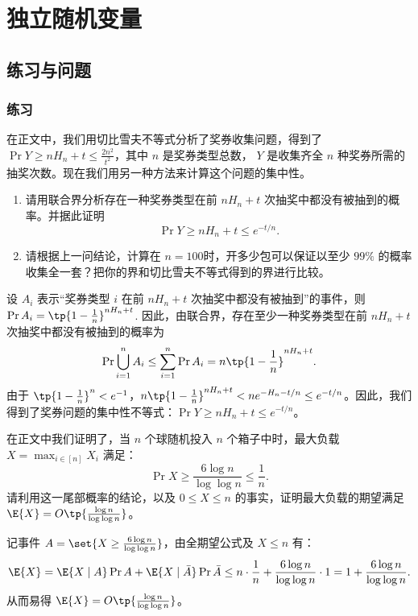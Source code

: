 \chapter{独立随机变量}
\section*{练习与问题}

\subsection*{练习}

\begin{exercise}
    在正文中，我们用切比雪夫不等式分析了奖券收集问题，得到了 $\Pr{Y\ge n H_n+t}\le \frac{2n^2}{t^2}$，其中 $n$ 是奖券类型总数， $Y$ 是收集齐全 $n$ 种奖券所需的抽奖次数。现在我们用另一种方法来计算这个问题的集中性。
    \begin{enumerate}
        \item 请用联合界分析存在一种奖券类型在前 $n H_n + t$ 次抽奖中都没有被抽到的概率。并据此证明
        \[
            \Pr{Y\ge n H_n+t}\le e^{-t/n}.
        \]
        \item 请根据上一问结论，计算在 $n=100$时，开多少包可以保证以至少 $99\%$ 的概率收集全一套？把你的界和切比雪夫不等式得到的界进行比较。
    \end{enumerate}
\end{exercise}
\begin{solution}
    设 $A_i$ 表示“奖券类型 $i$ 在前 $n H_n + t$ 次抽奖中都没有被抽到”的事件，则 $\Pr{A_i} = \tp{1 - \frac{1}{n}}^{n H_n + t}$. 因此，由联合界，存在至少一种奖券类型在前 $n H_n + t$ 次抽奖中都没有被抽到的概率为
    \[
        \Pr{\bigcup_{i=1}^n A_i} \le \sum_{i=1}^n \Pr{A_i} = n \tp{1 - \frac{1}{n}}^{n H_n + t}.
    \]
    由于 $\tp{1 - \frac{1}{n}}^n < e^{-1}$，$n\tp{1 - \frac{1}{n}}^{n H_n + t} < n e^{-H_n - t/n} \le e^{-t/n}$。因此，我们得到了奖券问题的集中性不等式：$\Pr{Y\ge n H_n+t}\le e^{-t/n}$。
\end{solution}

\begin{exercise}
在正文中我们证明了，当 $n$ 个球随机投入 $n$ 个箱子中时，最大负载 $X = \max_{i\in[n]} X_i$ 满足：
\[
    \Pr{X \ge \frac{6 \log n}{\log \log n}} \le \frac{1}{n}.
\]
请利用这一尾部概率的结论，以及 $0\le X \le n$ 的事实，证明最大负载的期望满足 $\E{X} = O\tp{\frac{\log n}{\log\log n}}$。
\end{exercise}
\begin{solution}
    记事件 $A = \set{X \ge \frac{6 \log n}{\log \log n}}$，由全期望公式及 $X \le n$ 有：
    \[
        \E{X} = \E{X \mid A}\Pr{A} + \E{X \mid \bar{A}}\Pr{\bar{A}} \le n \cdot \frac{1}{n} + \frac{6\log n}{\log\log n} \cdot 1 = 1 + \frac{6\log n}{\log\log n}.
    \]
    从而易得 $\E{X} = O\tp{\frac{\log n}{\log\log n}}$。
\end{solution}

